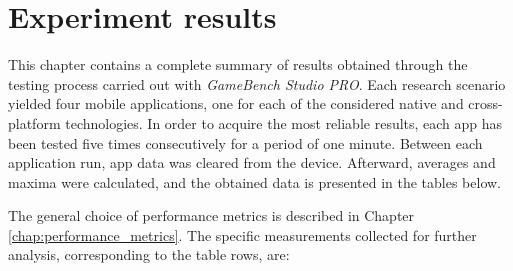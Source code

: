 
\chapter{Experiment results}

This chapter contains a complete summary of results obtained through the testing process carried out with \emph{GameBench Studio PRO}. Each research scenario yielded four mobile applications, one for each of the considered native and cross-platform technologies. In order to acquire the most reliable results, each app has been tested five times consecutively for a period of one minute. Between each application run, app data was cleared from the device. Afterward, averages and maxima were calculated, and the obtained data is presented in the tables below.

\bigskip

The general choice of performance metrics is described in Chapter \ref{chap:performance_metrics}. The specific measurements collected for further analysis, corresponding to the table rows, are:

